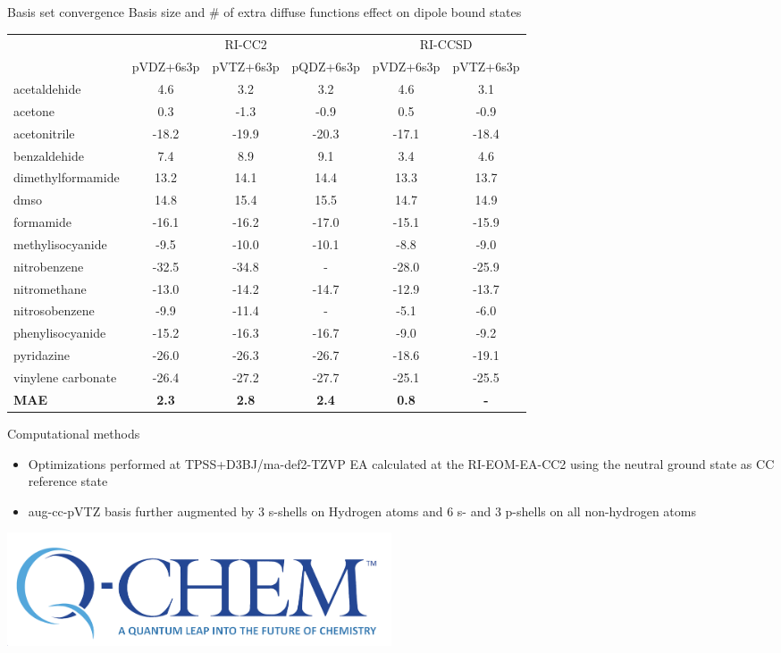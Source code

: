 \documentclass[9pt,t,xcolor=table]{beamer}
\begin{document}
\iffalse
\begin{frame}{\huge Basis set convergence}\large
	Basis size and \# of extra diffuse functions effect on dipole bound states\\
	\begin{table}[h!]
		\centering
		\footnotesize
		\begin{tabular}{lccccc}
		 & \multicolumn{3}{c}{RI-CC2} & \multicolumn{2}{c}{RI-CCSD} \\
		\cmidrule(lr){2-4} \cmidrule(lr){5-6}
		 & pVDZ+6s3p & pVTZ+6s3p & pQDZ+6s3p & pVDZ+6s3p & pVTZ+6s3p \\
		\midrule
		acetaldehide & 4.6 & 3.2 & 3.2 & 4.6 & 3.1 \\
		acetone & 0.3 & -1.3 & -0.9 & 0.5 & -0.9 \\
		acetonitrile & -18.2 & -19.9 & -20.3 & -17.1 & -18.4 \\
		benzaldehide & 7.4 & 8.9 & 9.1 & 3.4 & 4.6 \\
		dimethylformamide & 13.2 & 14.1 & 14.4 & 13.3 & 13.7 \\
		dmso & 14.8 & 15.4 & 15.5 & 14.7 & 14.9 \\
		formamide & -16.1 & -16.2 & -17.0 & -15.1 & -15.9 \\
		methylisocyanide & -9.5 & -10.0 & -10.1 & -8.8 & -9.0 \\
		nitrobenzene & -32.5 & -34.8 & - & -28.0 & -25.9 \\
		nitromethane & -13.0 & -14.2 & -14.7 & -12.9 & -13.7 \\
		nitrosobenzene & -9.9 & -11.4 & - & -5.1 & -6.0 \\
		phenylisocyanide & -15.2 & -16.3 & -16.7 & -9.0 & -9.2 \\
		pyridazine & -26.0 & -26.3 & -26.7 & -18.6 & -19.1 \\
		vinylene carbonate& -26.4 & -27.2 & -27.7 & -25.1 & -25.5 \\
		\midrule
		\textbf{MAE} & \textbf{2.3} & \textbf{2.8} & \textbf{2.4} & \textbf{0.8} & \textbf{-} \\
		\bottomrule
		\end{tabular}
	\end{table}
\end{frame}

\begin{frame}{\huge Computational methods}\large
	\vspace{5pt}
	\begin{itemize}
		\item Optimizations performed at TPSS+D3BJ/ma-def2-TZVP
		EA calculated at the RI-EOM-EA-CC2 using the neutral ground state as CC reference state
		\item aug-cc-pVTZ basis further augmented by 3 s-shells on Hydrogen atoms and 6 s- and 3 p-shells on all non-hydrogen atoms
	\end{itemize}
	\vspace{35pt}
	\centering
	\includegraphics[width=0.5\textwidth]{Figs/QCLogo.png}
\end{frame}
\end{document}
